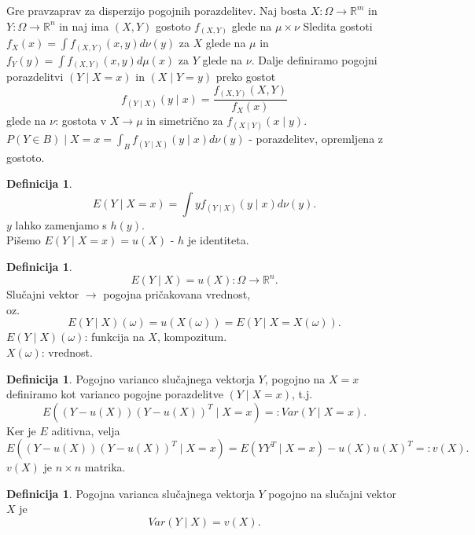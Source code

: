 \documentclass[a4paper, 12pt]{book}
\theoremstyle{definition}
\newtheorem{defn}[counter]{Definicija}
\theoremstyle{remark}
\newcommand{\R}{\mathbb{R}}
\begin{document}
Gre pravzaprav za disperzijo pogojnih porazdelitev.
Naj bosta $X: \Omega \to \R^m$ in $Y: \Omega \to \R^n$ in naj ima $(X,Y)$ gostoto $f_{(X,Y)}$ glede na $\mu \times \nu$
Sledita gostoti \\
$f_X(x) = \int f_{(X,Y)}(x,y) d\nu (y)$ za $X$ glede na $\mu$ in \\
$f_Y(y) = \int f_{(X,Y)}(x,y) d\mu (x)$ za $Y$ glede na $\nu$.
Dalje definiramo pogojni porazdelitvi $(Y \mid X = x)$ in $(X \mid Y = y)$ preko gostot
\begin{equation*}
  f_{(Y \mid X)}(y \mid x) = \frac{f_{(X,Y)}(X,Y)}{f_X(x)}
\end{equation*}
glede na $\nu$: gostota v $X \to \mu$ in simetrično za $f_{(X \mid Y)}(x \mid y)$. \\
$P(Y \in B) \mid X = x = \int_B f_{(Y \mid X)}(y \mid x) d\nu (y)$ - porazdelitev, opremljena z gostoto.
\begin{defn}
  \begin{equation*}
    E(Y \mid X = x) = \int y f_{(Y \mid X)}(y \mid x) d\nu (y).
  \end{equation*}
  $y$ lahko zamenjamo s $h(y)$. \\
  Pišemo $E(Y \mid X = x) = u(X)$ - $h$ je identiteta.
\end{defn}
\begin{defn}
  \begin{equation*}
    E(Y \mid X) = u(X): \Omega \to \R^n.
  \end{equation*}
  Slučajni vektor $\to$ pogojna pričakovana vrednost, \\
  oz.
  \begin{equation*}
    E(Y \mid X)(\omega) = u(X(\omega)) = E(Y \mid X = X(\omega)).
  \end{equation*}
  $E(Y \mid X)(\omega)$: funkcija na $X$, kompozitum. \\
  $X(\omega)$: vrednost.
\end{defn}
\begin{defn}
  Pogojno varianco slučajnega vektorja $Y$, pogojno na $X = x$ definiramo kot varianco pogojne porazdelitve $(Y \mid X = x)$, t.j.
  \begin{equation*}
    E((Y - u(X))(Y - u(X))^T \mid X = x) =: Var(Y \mid X = x).
  \end{equation*}
  Ker je $E$ aditivna, velja
  \begin{equation*}
    E((Y - u(X))(Y - u(X))^T \mid X = x) = E(Y Y^T \mid X = x) - u(X) u(X)^T =: v(X).
  \end{equation*}
  $v(X)$ je $n \times n$ matrika.
\end{defn}
\begin{defn}
  Pogojna varianca slučajnega vektorja $Y$ pogojno na slučajni vektor $X$ je
  \begin{equation*}
    Var(Y \mid X) = v(X).
  \end{equation*}
\end{defn}
\end{document}
